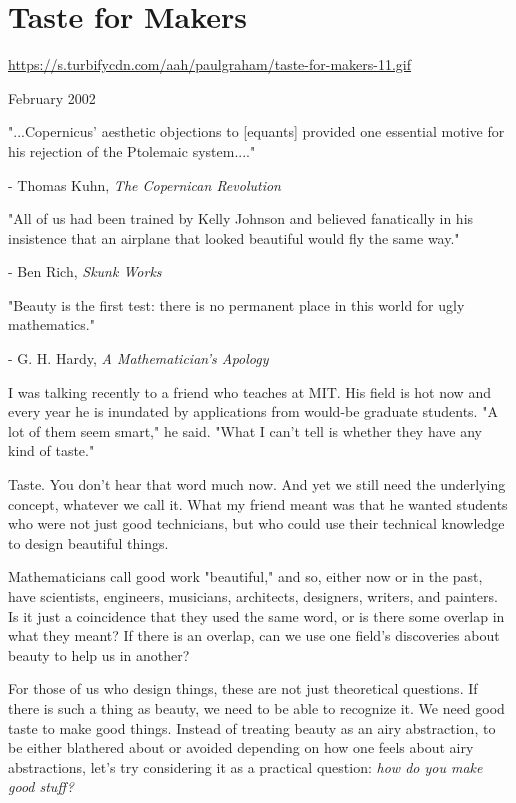 \chapter{Taste for Makers}

\href{https://s.turbifycdn.com/aah/paulgraham/taste-for-makers-11.gif}{https://s.turbifycdn.com/aah/paulgraham/taste-for-makers-11.gif}



February 2002





"...Copernicus'
aesthetic objections to [equants] provided one essential
motive for his rejection of the Ptolemaic system...."

- Thomas Kuhn, \emph{The Copernican Revolution}

"All of us had been trained by Kelly Johnson and believed
fanatically in his insistence that an airplane that looked
beautiful would fly the same way."

- Ben Rich, \emph{Skunk Works}

"Beauty is the first test: there is no permanent place in this
world for ugly mathematics."

- G. H. Hardy, \emph{A Mathematician's Apology}




I was talking recently to a friend who teaches
at MIT.  His field is hot now and
every year he is inundated by applications from
would-be graduate students.  "A lot of them seem smart,"
he said.  "What I can't tell is whether they have any kind
of taste."

Taste.  You don't hear that word much now.
And yet we still need the underlying
concept, whatever we call it.  What my friend meant was
that he wanted students who were not just good technicians,
but who could use their technical knowledge to
design beautiful things.

Mathematicians call good work "beautiful,"
and so, either now or in the past, have
scientists, engineers, musicians, architects, designers,
writers, and painters.
Is it just a coincidence that they used the same word, or is   
there some overlap in what they meant?  If there
is an overlap, can we use one field's discoveries
about beauty to help us in another?

For those of us who design things, these are not just
theoretical questions.  If there is such a thing as
beauty, we need to be able to recognize it.  We need
good taste to make good things.
Instead of
treating beauty as an airy abstraction, to be either blathered
about or avoided depending on how one feels about airy
abstractions, let's try considering it as a practical question:
\emph{how do you make good stuff?}



